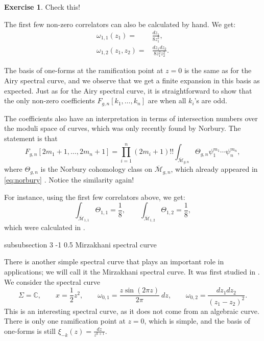 \documentclass[reqno,oneside,11pt]{amsart}
\makeatletter
\theoremstyle{plain}
\theoremstyle{definition}
\newtheorem*{exercise}{Exercise}
\theoremstyle{remark}
\numberwithin{equation}{section}
\renewcommand{\subsubsection}{\@startsection
{subsubsection}%
{3}%
{\z@}%
{-1\baselineskip}%
{0.5\baselineskip}%
{\normalfont \it \normalsize}} %
\makeatother
\begin{document}
\begin{exercise}
Check this!
\end{exercise}

The first few non-zero correlators can also be calculated by hand. We get:
\begin{align}
\omega_{1,1}(z_1) =& \frac{dz_1}{8 z_1^2},\\
\omega_{1,2}(z_1, z_2) =& \frac{dz_1 dz_2}{8 z_1^2 z_2^2}.
\end{align}

The basis of one-forms at the ramification point at $z=0$ is the same as for the Airy spectral curve, and we observe that we get a finite expansion in this basis as expected. Just as for the Airy spectral curve, it is straightforward to show that the only non-zero coefficients $F_{g,n}[k_1,\ldots,k_n]$ are when all $k_i$'s are odd. 

The coefficients also have an interpretation in terms of intersection numbers over the moduli space of curves, which was only recently found by Norbury. The statement is that
\begin{equation}
F_{g,n}[2m_1+1, \ldots, 2m_n+1] = \prod_{i=1}^n (2m_i+1)!! \int_{\overline{\mathcal{M}}_{g,n}} \Theta_{g,n} \psi_1^{m_1} \cdots \psi_n^{m_n},
\end{equation}
where $\Theta_{g,n}$ is the Norbury cohomology class on $\overline{\mathcal{M}}_{g,n}$, which already appeared in \eqref{eq:norbury} \cite{No17}. Notice the similarity again!

For instance, using the first few correlators above, we get:
\begin{equation}
\int_{\overline{\mathcal{M}}_{1,1}} \Theta_{1,1} = \frac{1}{8}, \qquad \int_{\overline{\mathcal{M}}_{1,2}} \Theta_{1,2} = \frac{1}{8},
\end{equation}
which were calculated in \cite{No17}.

\subsubsection{Mirzakhani spectral curve}

There is another simple spectral curve that plays an important role in applications; we will call it the Mirzakhani spectral curve. It was first studied in \cite{EO07c}. We consider the spectral curve
\begin{equation}
\Sigma = \mathbb{C}, \qquad x = \frac{1}{2}z^2, \qquad \omega_{0,1} = \frac{z \sin(2 \pi z)}{2 \pi}\ dz, \qquad \omega_{0,2} = \frac{dz_1 dz_2}{(z_1-z_2)^2}.
\end{equation}
This is an interesting spectral curve, as it does not come from an algebraic curve. There is only one ramification point at $z=0$, which is simple, and the basis of one-forms is still $\xi_{-k}(z) = \frac{dz}{z^{k+1}}$.
\end{document}
